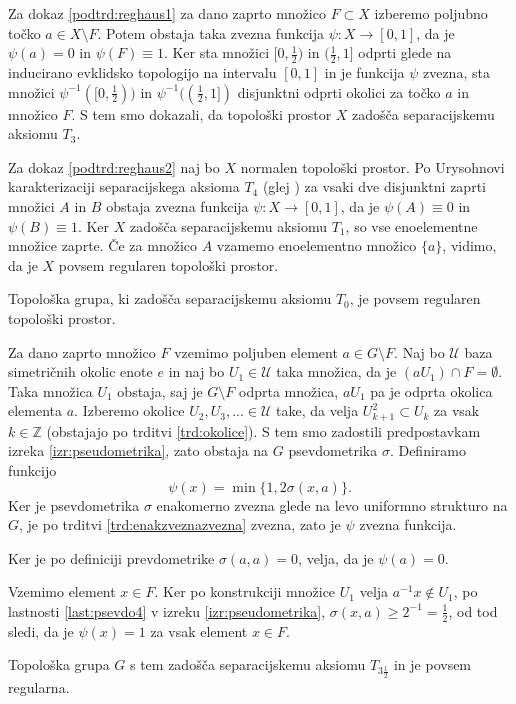 \documentclass[mat1]{fmfdelo}
\newcommand{\Z}{\mathbb Z}
\newcommand{\Ucurl}{\mathcal{U}}
\begin{document}
\begin{dokaz}
Za dokaz \ref{podtrd:reghaus1} za dano zaprto množico $F \subset X$ izberemo poljubno točko $a \in X \setminus F$. Potem obstaja taka zvezna funkcija $\psi\colon X \to [0, 1]$, da je $\psi(a) = 0$ in $\psi(F) \equiv 1$.
Ker sta množici $[0, \frac{1}{2})$ in $(\frac{1}{2}, 1]$ odprti glede na inducirano evklidsko topologijo na intervalu $[0, 1]$ in je funkcija $\psi$ zvezna, sta množici $\psi^{-1}([0, \frac{1}{2}))$ in $\psi^{-1}((\frac{1}{2}, 1])$ disjunktni odprti okolici za točko $a$ in množico $F$.
S tem smo dokazali, da topološki prostor $X$ zadošča separacijskemu aksiomu $T_3$.

Za dokaz \ref{podtrd:reghaus2} naj bo $X$ normalen topološki prostor. Po Urysohnovi karakterizaciji separacijskega aksioma $T_4$ (glej \cite{bib:top}) za vsaki dve disjunktni zaprti množici $A$ in $B$ obstaja zvezna funkcija $\psi\colon X \to [0, 1]$, da je $\psi(A) \equiv 0 $ in $\psi(B) \equiv 1$. Ker $X$ zadošča separacijskemu aksiomu $T_1$, so vse enoelementne množice zaprte. Če za množico $A$ vzamemo enoelementno množico $\lbrace a \rbrace$, vidimo, da je $X$ povsem regularen topološki prostor.
\end{dokaz}

\begin{izrek}\label{izr:t3pol}
	Topološka grupa, ki zadošča separacijskemu aksiomu $T_0$, je povsem regularen topološki prostor.
\end{izrek}

\begin{dokaz}
Za dano zaprto množico $F$ vzemimo poljuben element $a \in G\setminus F$.
Naj bo $\Ucurl$ baza simetričnih okolic enote $e$ in naj bo $U_1 \in \Ucurl$ taka množica, da je $(aU_1)\cap F = \emptyset$. Taka množica $U_1$ obstaja, saj je $G\setminus F$ odprta množica, $aU_1$ pa je odprta okolica elementa $a$. Izberemo okolice $U_2, U_3,... \in \Ucurl$ take, da velja $U_{k+1}^2 \subset U_k$ za vsak $k \in \Z$ (obstajajo po trditvi \ref{trd:okolice}). S tem smo zadostili predpostavkam izreka \ref{izr:pseudometrika}, zato obstaja na $G$ psevdometrika $\sigma$. Definiramo funkcijo \[ \psi(x) = \min\lbrace 1, 2\sigma(x, a)\rbrace. \] Ker je psevdometrika $\sigma$ enakomerno zvezna glede na levo uniformno strukturo na $G$, je po trditvi \ref{trd:enakzveznazvezna} zvezna, zato je $\psi$ zvezna funkcija.

 Ker je po definiciji prevdometrike $\sigma(a, a) = 0$, velja, da je $\psi(a) = 0$.

Vzemimo element $x \in F$. Ker po konstrukciji množice $U_1$ velja $a^{-1}x \notin U_1$, po lastnosti \ref{last:psevdo4} v izreku \ref{izr:pseudometrika}, $\sigma(x, a) \geq 2^{-1} = \frac{1}{2}$, od tod sledi, da je $\psi(x) = 1$ za vsak element $x \in F$.

Topološka grupa $G$ s tem zadošča separacijskemu aksiomu $T_{3\frac{1}{2}}$ in je povsem regularna.
\end{dokaz}
\end{document}
